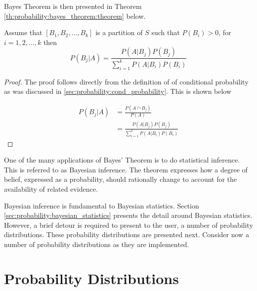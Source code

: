 Bayes Theorem is then presented in Theorem \ref{th:probability:bayes_theorem:theorem} below.

\begin{theorem}
      \label{th:probability:bayes_theorem:theorem}
      Assume that $[B_{1}, B_{2}, \dots, B_{k}]$ is a partition of $S$ such that $P(B_{i}) > 0$, for $i = 1,2, \dots, k$ then
      \begin{equation*}
            P(B_{j} \vert A) = \frac{P(A \vert B_{j})P(B_{j})}{\sum_{i=1}^{k} P(A \vert B_{i})P(B_{i})}
      \end{equation*}
\end{theorem}

\begin{proof}
      The proof follows directly from the definition of of conditional probability as was discussed in \ref{sec:probability:cond_probability}. This is shown below

      \begin{equation*}
            \begin{split}
                  P(B_{j} \vert A)
                  &= \frac{P(A \cap B_{j})}{P(A)}\\
                  &= \frac{P(A \vert B_{j})P(B_{j})}{\sum_{i=1}^{k} P(A \vert B_{i})P(B_{i})}
            \end{split}
      \end{equation*}
\end{proof}

One of the many applications of Bayes' Theorem is to do statistical inference. This is referred to as Bayesian inference. The theorem expresses how a degree of belief, expressed as a probability, should rationally change to account for the availability of related evidence.

Bayesian inference is fundamental to Bayesian statistics. Section \ref{sec:probability:bayesian_statistics} presents the detail around Bayesian statistics. However, a brief detour is required to present to the user, a number of probability distributions. These probability distributions are presented next. Consider now a number of probability distributions as they are implemented.



\section{Probability Distributions}
\label{sec:probability:probability_distributions}

